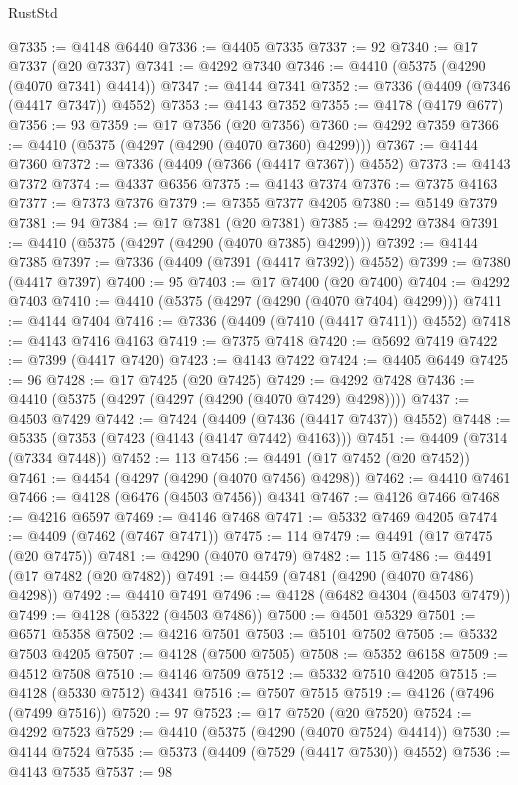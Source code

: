 \begin{lexlean}{RustStd}
\begin{coremodule}
@7335 := @4148 @6440
@7336 := @4405 @7335
@7337 := 92
@7340 := @17 @7337 (@20 @7337)
@7341 := @4292 @7340
@7346 := @4410 (@5375 (@4290 (@4070 @7341) @4414))
@7347 := @4144 @7341
@7352 := @7336 (@4409 (@7346 (@4417 @7347)) @4552)
@7353 := @4143 @7352
@7355 := @4178 (@4179 @677)
@7356 := 93
@7359 := @17 @7356 (@20 @7356)
@7360 := @4292 @7359
@7366 := @4410 (@5375 (@4297 (@4290 (@4070 @7360) @4299)))
@7367 := @4144 @7360
@7372 := @7336 (@4409 (@7366 (@4417 @7367)) @4552)
@7373 := @4143 @7372
@7374 := @4337 @6356
@7375 := @4143 @7374
@7376 := @7375 @4163
@7377 := @7373 @7376
@7379 := @7355 @7377 @4205
@7380 := @5149 @7379
@7381 := 94
@7384 := @17 @7381 (@20 @7381)
@7385 := @4292 @7384
@7391 := @4410 (@5375 (@4297 (@4290 (@4070 @7385) @4299)))
@7392 := @4144 @7385
@7397 := @7336 (@4409 (@7391 (@4417 @7392)) @4552)
@7399 := @7380 (@4417 @7397)
@7400 := 95
@7403 := @17 @7400 (@20 @7400)
@7404 := @4292 @7403
@7410 := @4410 (@5375 (@4297 (@4290 (@4070 @7404) @4299)))
@7411 := @4144 @7404
@7416 := @7336 (@4409 (@7410 (@4417 @7411)) @4552)
@7418 := @4143 @7416 @4163
@7419 := @7375 @7418
@7420 := @5692 @7419
@7422 := @7399 (@4417 @7420)
@7423 := @4143 @7422
@7424 := @4405 @6449
@7425 := 96
@7428 := @17 @7425 (@20 @7425)
@7429 := @4292 @7428
@7436 := @4410 (@5375 (@4297 (@4297 (@4290 (@4070 @7429) @4298))))
@7437 := @4503 @7429
@7442 := @7424 (@4409 (@7436 (@4417 @7437)) @4552)
@7448 := @5335 (@7353 (@7423 (@4143 (@4147 @7442) @4163)))
@7451 := @4409 (@7314 (@7334 @7448))
@7452 := 113
@7456 := @4491 (@17 @7452 (@20 @7452))
@7461 := @4454 (@4297 (@4290 (@4070 @7456) @4298))
@7462 := @4410 @7461
@7466 := @4128 (@6476 (@4503 @7456)) @4341
@7467 := @4126 @7466
@7468 := @4216 @6597
@7469 := @4146 @7468
@7471 := @5332 @7469 @4205
@7474 := @4409 (@7462 (@7467 @7471))
@7475 := 114
@7479 := @4491 (@17 @7475 (@20 @7475))
@7481 := @4290 (@4070 @7479)
@7482 := 115
@7486 := @4491 (@17 @7482 (@20 @7482))
@7491 := @4459 (@7481 (@4290 (@4070 @7486) @4298))
@7492 := @4410 @7491
@7496 := @4128 (@6482 @4304 (@4503 @7479))
@7499 := @4128 (@5322 (@4503 @7486))
@7500 := @4501 @5329
@7501 := @6571 @5358
@7502 := @4216 @7501
@7503 := @5101 @7502
@7505 := @5332 @7503 @4205
@7507 := @4128 (@7500 @7505)
@7508 := @5352 @6158
@7509 := @4512 @7508
@7510 := @4146 @7509
@7512 := @5332 @7510 @4205
@7515 := @4128 (@5330 @7512) @4341
@7516 := @7507 @7515
@7519 := @4126 (@7496 (@7499 @7516))
@7520 := 97
@7523 := @17 @7520 (@20 @7520)
@7524 := @4292 @7523
@7529 := @4410 (@5375 (@4290 (@4070 @7524) @4414))
@7530 := @4144 @7524
@7535 := @5373 (@4409 (@7529 (@4417 @7530)) @4552)
@7536 := @4143 @7535
@7537 := 98

\end{coremodule}
\end{lexlean}
